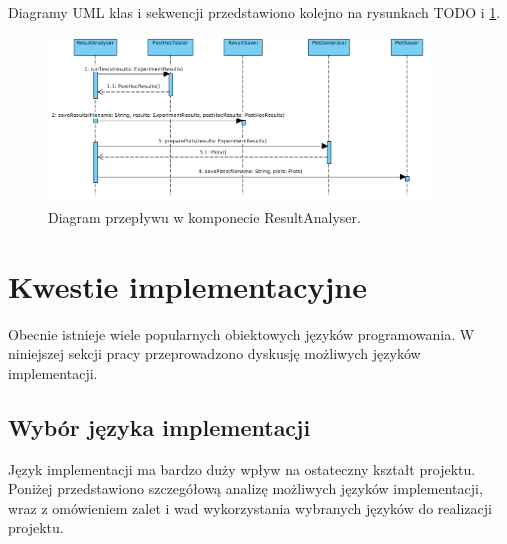 \documentclass[12pt]{article}
\begin{document}
Diagramy UML klas i sekwencji przedstawiono kolejno na rysunkach TODO i \ref{fig:sequenceResultAnalyser}.

\begin{figure}
	\centering
	\includegraphics[width=0.9\textwidth]{img/sequenceResultAnalyser.png}
	\caption{Diagram przepływu w komponecie ResultAnalyser.}
	\label{fig:sequenceResultAnalyser}
\end{figure}



\section{Kwestie implementacyjne}

Obecnie istnieje wiele popularnych obiektowych języków programowania. W niniejszej sekcji pracy przeprowadzono dyskusję możliwych języków implementacji.

\subsection{Wybór języka implementacji}

Język implementacji ma bardzo duży wpływ na ostateczny kształt projektu. Poniżej przedstawiono szczegółową analizę możliwych języków implementacji, wraz z omówieniem zalet i wad wykorzystania wybranych języków do realizacji projektu.
\end{document}
